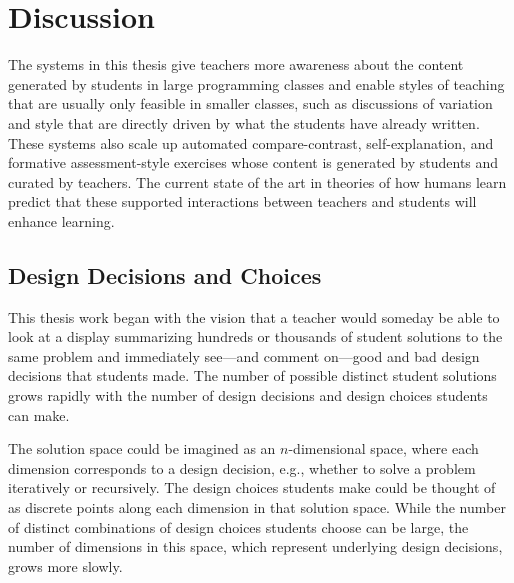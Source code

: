 \chapter{Discussion}\label{chapter:discussion}

The systems in this thesis give teachers more awareness about the content generated by students in large programming classes and enable styles of teaching that are usually only feasible in smaller classes, such as discussions of variation and style that are directly driven by what the students have already written. These systems also scale up automated compare-contrast, self-explanation, and formative assessment-style exercises whose content is generated by students and curated by teachers. The current state of the art in theories of how humans learn predict that these supported interactions between teachers and students will enhance learning.

\section{Design Decisions and Choices}


This thesis work began with the vision that a teacher would someday be able to look at a display summarizing hundreds or thousands of student solutions to the same problem and immediately see---and comment on---good and bad design decisions that students made. The number of possible distinct student solutions grows rapidly with the number of design decisions and design choices students can make. 

The solution space could be imagined as an $n$-dimensional space, where each dimension corresponds to a design decision, e.g., whether to solve a problem iteratively or recursively. The design choices students make could be thought of as discrete points along each dimension in that solution space. While the number of distinct combinations of design choices students choose can be large, the number of dimensions in this space, which represent underlying design decisions, grows more slowly. 

